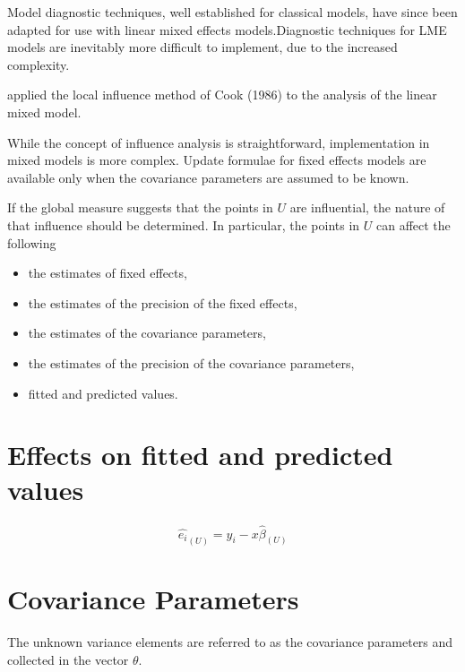 \documentclass[12pt, a4paper]{article}
\begin{document}
			Model diagnostic techniques, well established for classical models, have since been adapted for use with linear mixed effects models.Diagnostic techniques for LME models are inevitably more difficult to implement, due to the increased complexity.
			


			
			
			 \citet{Beckman} applied the local influence method of Cook (1986) to the analysis of the linear mixed model.
			
			While the concept of influence analysis is straightforward, implementation in mixed models is more complex. Update formulae for fixed effects models are available only when the covariance parameters are assumed to be known.
			
			If the global measure suggests that the points in $U$ are influential, the nature of that influence should be determined. In particular, the points in $U$ can affect the following
			
			\begin{itemize}
				\item the estimates of fixed effects,
				\item the estimates of the precision of the fixed effects,
				\item the estimates of the covariance parameters,
				\item the estimates of the precision of the covariance parameters,
				\item fitted and predicted values.
			\end{itemize}

			
\section{Effects on fitted and predicted values}
\begin{equation}
\hat{e_{i}}_{(U)} = y_{i} - x\hat{\beta}_{(U)}
\end{equation}
			

\section{Covariance Parameters} %
The unknown variance elements are referred to as the covariance parameters and collected in the vector $\theta$.
\end{document}

